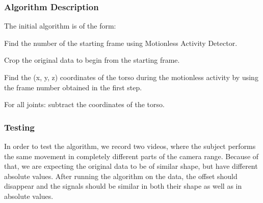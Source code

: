 \documentclass[10pt,a4paper]{article}
\begin{document}
\subsubsection{Algorithm Description}
\noindent
The initial algorithm is of the form:
\begin{compactitem}
\setlength{\itemsep}{1pt}
\setlength{\parskip}{0pt}
\setlength{\parsep}{0pt}
	\item Find the number of the starting frame using Motionless Activity Detector.
	\item Crop the original data to begin from the starting frame.
	\item Find the (x, y, z) coordinates of the torso during the motionless activity by using the frame number obtained in the first step.
	\item For all joints: subtract the coordinates of the torso.
\end{compactitem}

\subsubsection{Testing}
\noindent
In order to test the algorithm, we record two videos, where the subject performs the same movement in completely different parts of the camera range. Because of that, we are expecting the original data to be of similar shape, but have different absolute values. After running the algorithm on the data, the offset should disappear and the signals should be similar in both their shape as well as in absolute values.
\end{document}
